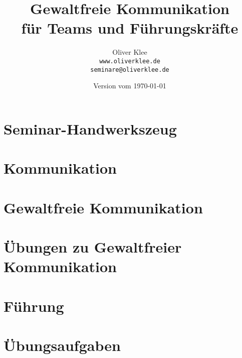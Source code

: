 \documentclass[a4paper,openany,twoside,titlepage,10pt,headsepline]{scrbook}
\title{Gewaltfreie Kommunikation\\für Teams und Führungskräfte}
\author{Oliver Klee\\\texttt{www.oliverklee.de}\\\texttt{seminare@oliverklee.de}}
\date{Version vom \today}
\begin{document}
\frontmatter

\maketitle

\tableofcontents


\mainmatter

\chapter{Seminar-Handwerkszeug}





\chapter{Kommunikation}






\chapter{Gewaltfreie Kommunikation}



















\chapter{Übungen zu Gewaltfreier Kommunikation}



\chapter{Führung}







\chapter{Übungsaufgaben}


\backmatter





\printindex
\end{document}
